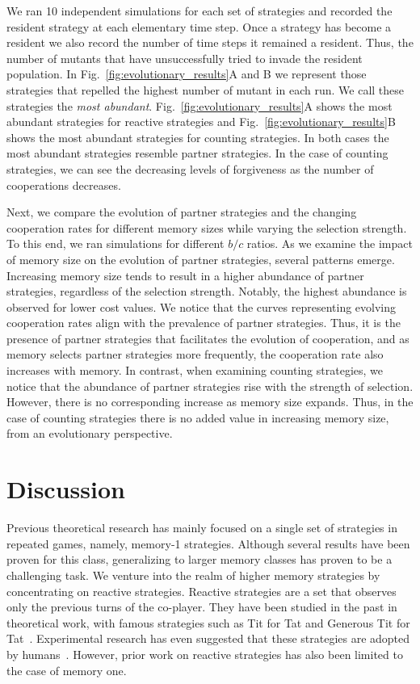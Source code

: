 \documentclass[11pt]{article}
\begin{document}
We ran 10 independent simulations for each set of
strategies and recorded the resident strategy at each elementary time step. Once
a strategy has become a resident we also record the number of time steps it
remained a resident. Thus, the number of mutants that have unsuccessfully tried
to invade the resident population. In Fig.~\ref{fig:evolutionary_results}A and B
we represent those strategies that repelled the highest number of mutant in each
run. We call these strategies the {\it most abundant}.
Fig.~\ref{fig:evolutionary_results}A shows the most abundant strategies for
reactive strategies and Fig.~\ref{fig:evolutionary_results}B shows the most
abundant strategies for counting strategies. In both cases the most abundant
strategies resemble partner strategies. In the case of counting strategies, we
can see the decreasing levels of forgiveness as the number of cooperations
decreases.

Next, we compare the evolution of partner strategies and the changing
cooperation rates for different memory sizes while varying the selection
strength. To this end, we ran simulations for different $b/c$ ratios.
As we examine the impact of memory size on the evolution of partner
strategies, several patterns emerge. Increasing memory size tends to result
in a higher abundance of partner strategies, regardless of the selection
strength. Notably, the highest abundance is observed for lower cost values. We
notice that the curves representing evolving cooperation rates align with the
prevalence of partner strategies. Thus, it is the presence of partner strategies
that facilitates the evolution of cooperation, and as memory selects partner
strategies more frequently, the cooperation rate also increases with memory.
In contrast, when examining
counting strategies, we notice that the abundance of partner strategies rise
with the strength of selection. However, there is no corresponding increase as
memory size expands. Thus, in the case of counting strategies there is no added
value in increasing memory size, from an evolutionary perspective.


\section*{Discussion}

Previous theoretical research has mainly focused on a single set of strategies
in repeated games, namely, memory-1 strategies. Although several results have
been proven for this class, generalizing to larger memory classes has proven to
be a challenging task. We venture into the realm of higher memory strategies by
concentrating on reactive strategies. Reactive strategies are a set that
observes only the previous turns of the co-player. They have been studied in the
past in theoretical work, with famous strategies such as Tit for Tat and
Generous Tit for Tat~\cite{nowak:Nature:1993}. Experimental research has even
suggested that these strategies are adopted by humans~\cite{engle:ET:2006,
bruttel:TD:2012}. However, prior work on reactive strategies has also been
limited to the case of memory one.
\end{document}
